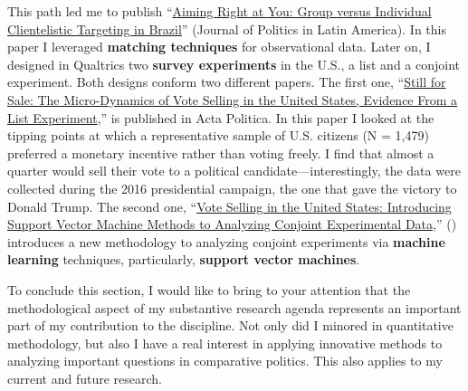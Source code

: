 \documentclass[10pt,stdletter,dateno,sigleft]{newlfm} %
\begin{document}
\begin{newlfm}
This path led me to publish ``\href{https://journals.sub.uni-hamburg.de/giga/jpla/article/view/1121/1128}{Aiming Right at You: Group versus Individual Clientelistic Targeting in Brazil}'' (Journal of Politics in Latin America). In this paper I leveraged {\bf matching techniques} for observational data. Later on, I designed in Qualtrics two {\bf survey experiments} in the U.S., a list and a conjoint experiment. Both designs conform two different papers. The first one, ``\href{https://github.com/hbahamonde/Vote_Selling/raw/master/Bahamonde_VoteSellingUS.pdf}{Still for Sale: The Micro-Dynamics of Vote Selling in the United States, Evidence From a List Experiment},'' is published in Acta Politica. In this paper I looked at the tipping points at which a representative sample of U.S. citizens (N = 1,479) preferred a monetary incentive rather than voting freely. I find that almost a quarter would sell their vote to a political candidate---interestingly, the data were collected during the 2016 presidential campaign, the one that gave the victory to Donald Trump. The second one, ``\href{https://github.com/hbahamonde/Conjoint_US/raw/master/Bahamonde_Quininao_Conjoint_Letter_PA.pdf}{Vote Selling in the United States: Introducing Support Vector Machine Methods to Analyzing Conjoint Experimental Data},'' (\emph{\unskip}) introduces a new methodology to analyzing conjoint experiments via {\bf machine learning} techniques, particularly, {\bf support vector machines}. 

To conclude this section, I would like to bring to your attention that the methodological aspect of my substantive research agenda represents an important part of my contribution to the discipline. Not only did I minored in quantitative methodology, but also I have a real interest in applying innovative methods to analyzing important questions in comparative politics. This also applies to my current and future research.



\end{newlfm}
\end{document}

